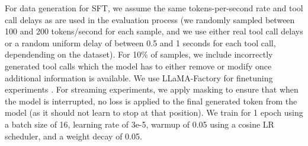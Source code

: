 For data generation for SFT, we assume the same tokens-per-second rate and tool call delays as are used in the evaluation process (we randomly sampled between 100 and 200 tokens/second for each sample, and we use either real tool call delays or a random uniform delay of between 0.5 and 1 seconds for each tool call, dependending on the dataset).
For 10\% of samples, we include incorrectly generated tool calls which the model has to either remove or modify once additional information is available.
We use LLaMA-Factory for finetuning experiments \citep{zheng2024llamafactory}.
For streaming experiments, we apply masking to ensure that when the model is interrupted, no loss is applied to the final generated token from the model (as it should not learn to stop at that position).
We train for 1 epoch using a batch size of 16, learning rate of 3e-5, warmup of 0.05 using a cosine LR scheduler, and a weight decay of 0.05.
